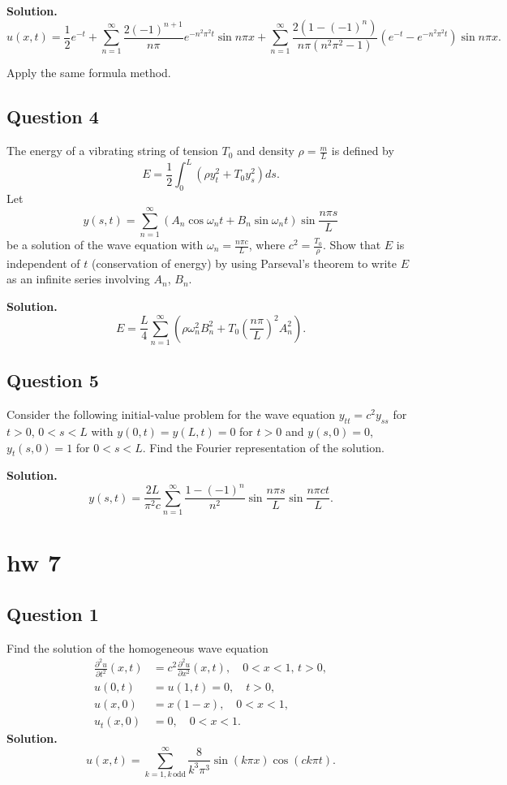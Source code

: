 \documentclass[lang=en,11pt]{template}
\begin{document}
\textbf{Solution.}
\[
u(x,t) = \frac{1}{2} e^{-t} + \sum_{n=1}^{\infty} \frac{2 (-1)^{n+1}}{n \pi} e^{-n^2 \pi^2 t} \sin n \pi x + \sum_{n=1}^{\infty} \frac{2 (1 - (-1)^n)}{n \pi (n^2 \pi^2 - 1)} \left( e^{-t} - e^{-n^2 \pi^2 t} \right) \sin n \pi x.
\]

\begin{solution}
    Apply the same formula method.
\end{solution}



\section*{Question 4}
The energy of a vibrating string of tension $T_0$ and density $\rho = \frac{m}{L}$ is defined by
\[
E = \frac{1}{2} \int_0^L \left( \rho y_t^2 + T_0 y_s^2 \right) ds.
\]
Let
\[
y(s,t) = \sum_{n=1}^{\infty} \left( A_n \cos \omega_n t + B_n \sin \omega_n t \right) \sin \frac{n \pi s}{L}
\]
be a solution of the wave equation with $\omega_n = \frac{n \pi c}{L}$, where $c^2 = \frac{T_0}{\rho}$. Show that $E$ is independent of $t$ (conservation of energy) by using Parseval’s theorem to write $E$ as an infinite series involving $A_n$, $B_n$.

\textbf{Solution.}
\[
E = \frac{L}{4} \sum_{n=1}^{\infty} \left( \rho \omega_n^2 B_n^2 + T_0 \left( \frac{n \pi}{L}  \right)^2 A_n^2 \right).
\]

\section*{Question 5}
Consider the following initial-value problem for the wave equation $y_{tt} = c^2 y_{ss}$ for $t > 0$, $0 < s < L$ with $y(0,t) = y(L,t) = 0$ for $t > 0$ and $y(s,0) = 0$, $y_t(s,0) = 1$ for $0 < s < L$. Find the Fourier representation of the solution.

\textbf{Solution.}
\[
y(s,t) = \frac{2L}{\pi^2 c} \sum_{n=1}^{\infty} \frac{1 - (-1)^n}{n^2} \sin \frac{n \pi s}{L} \sin \frac{n \pi c t}{L}.
\]











\chapter{hw 7}
\section*{Question 1}
Find the solution of the homogeneous wave equation
\[
\begin{aligned}
\frac{\partial^2 u}{\partial t^2} (x, t) &= c^2 \frac{\partial^2 u}{\partial x^2} (x, t), \quad 0 < x < 1, \, t > 0, \\
u(0,t) &= u(1,t) = 0, \quad t > 0, \\
u(x,0) &= x(1 - x), \quad 0 < x < 1, \\
u_t(x,0) &= 0, \quad 0 < x < 1.
\end{aligned}
\]
\textbf{Solution.} 
\[
u(x,t) = \sum_{k=1, k \, \text{odd}}^{\infty} \frac{8}{k^3 \pi^3} \sin(k\pi x) \cos(ck\pi t).
\]
\end{document}
